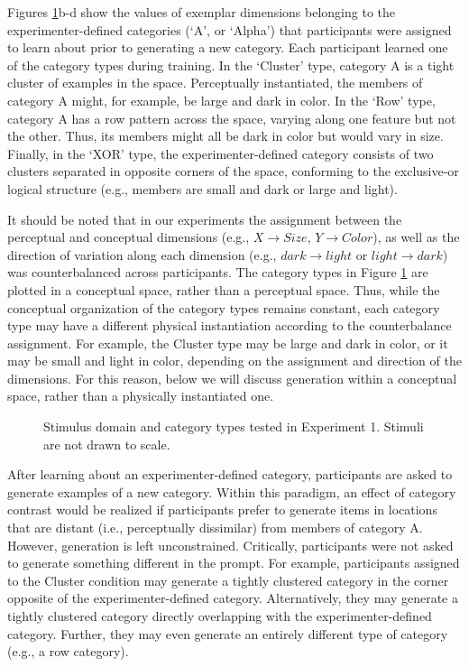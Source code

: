 \documentclass[12pt]{article}
\newcommand\inputpgf[2]{{
\let\pgfimageWithoutPath\pgfimage
\renewcommand{\pgfimage}[2][]{\pgfimageWithoutPath[##1]{#1/##2}}

}}
\begin{document}
\begin{flushleft}
Figures \ref{fig:e1-conditions}b-d show the values of exemplar dimensions
belonging to the experimenter-defined categories (`A', or `Alpha') that
participants were assigned to learn about prior to generating a new category.
Each participant learned one of the category types during training. In the
`Cluster' type, category A is a tight cluster of examples in the space.
Perceptually instantiated, the members of category A might, for example, be
large and dark in color. In the `Row' type, category A has a row pattern across
the space, varying along one feature but not the other. Thus, its members might
all be dark in color but would vary in size. Finally, in the `XOR' type, the
experimenter-defined category consists of two clusters separated in opposite
corners of the space, conforming to the exclusive-or logical structure (e.g.,
members are small and dark or large and light).

It should be noted that in our experiments the assignment between the perceptual
and conceptual dimensions (e.g., $X \rightarrow Size$, $Y \rightarrow Color$),
as well as the direction of variation along each dimension (e.g., $dark
\rightarrow light$ or $light \rightarrow dark$) was counterbalanced across
participants. The category types in Figure \ref{fig:e1-conditions} are plotted
in a conceptual space, rather than a perceptual space. Thus, while the
conceptual organization of the category types remains constant, each category
type may have a different physical instantiation according to the counterbalance
assignment. For example, the Cluster type may be large and dark in color, or it
may be small and light in color, depending on the assignment and direction of
the dimensions. For this reason, below we will discuss generation within a
conceptual space, rather than a physically instantiated one.

\begin{figure}
    \begin{center} \inputpgf{figs/}{e1-conditions.pgf}
    \caption{Stimulus domain and category types tested in Experiment 1. Stimuli
are not drawn to scale.}
    \label{fig:e1-conditions}
    \end{center}
\end{figure}

After learning about an experimenter-defined category, participants are asked to
generate examples of a new category. Within this paradigm, an effect of category
contrast would be realized if participants prefer to generate items in locations
that are distant (i.e., perceptually dissimilar) from members of category A.
However, generation is left unconstrained. Critically, participants were not
asked to generate something different in the prompt. For example, participants
assigned to the Cluster condition may generate a tightly clustered category in
the corner opposite of the experimenter-defined category. Alternatively, they
may generate a tightly clustered category directly overlapping with the
experimenter-defined category. Further, they may even generate an entirely
different type of category (e.g., a row category).


\end{flushleft}
\end{document}
